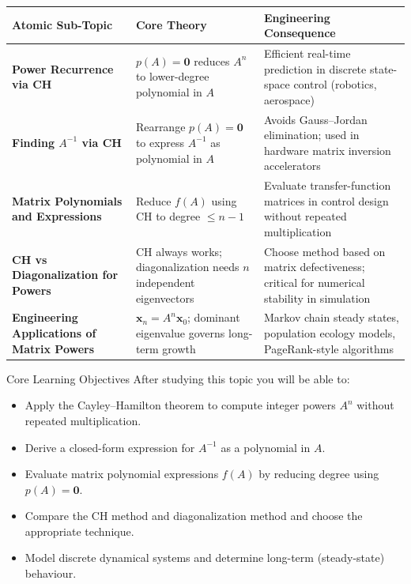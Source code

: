 \documentclass[12pt,a4paper]{article}
\begin{document}
\begin{center}
\begin{tabular}{>{\bfseries}p{4.5cm} p{5cm} p{5cm}}
\toprule
Atomic Sub-Topic & Core Theory & Engineering Consequence \\
\midrule
Power Recurrence via CH & \(p(A)=\mathbf{0}\) reduces \(A^n\) to lower-degree polynomial in \(A\) & Efficient real-time prediction in discrete state-space control (robotics, aerospace) \\
\addlinespace
Finding \(A^{-1}\) via CH & Rearrange \(p(A)=\mathbf{0}\) to express \(A^{-1}\) as polynomial in \(A\) & Avoids Gauss--Jordan elimination; used in hardware matrix inversion accelerators \\
\addlinespace
Matrix Polynomials and Expressions & Reduce \(f(A)\) using CH to degree \(\leq n-1\) & Evaluate transfer-function matrices in control design without repeated multiplication \\
\addlinespace
CH vs Diagonalization for Powers & CH always works; diagonalization needs \(n\) independent eigenvectors & Choose method based on matrix defectiveness; critical for numerical stability in simulation \\
\addlinespace
Engineering Applications of Matrix Powers & \(\mathbf{x}_n = A^n \mathbf{x}_0\); dominant eigenvalue governs long-term growth & Markov chain steady states, population ecology models, PageRank-style algorithms \\
\bottomrule
\end{tabular}
\end{center}

\begin{learnbox}{Core Learning Objectives}
After studying this topic you will be able to:
\begin{itemize}
  \item Apply the Cayley--Hamilton theorem to compute integer powers \(A^n\) without repeated multiplication.
  \item Derive a closed-form expression for \(A^{-1}\) as a polynomial in \(A\).
  \item Evaluate matrix polynomial expressions \(f(A)\) by reducing degree using \(p(A) = \mathbf{0}\).
  \item Compare the CH method and diagonalization method and choose the appropriate technique.
  \item Model discrete dynamical systems and determine long-term (steady-state) behaviour.
\end{itemize}
\end{learnbox}
\end{document}
